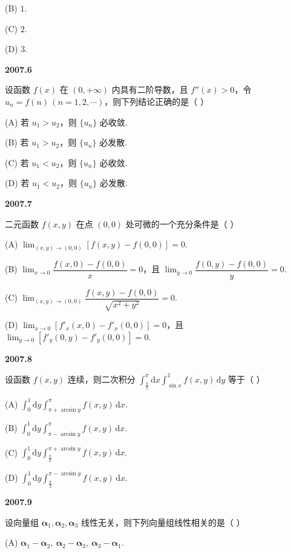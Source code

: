 \documentclass[UTF8,12pt,fontset=windows]{ctexart}
\begin{document}
(B) $1$.

(C) $2$.

(D) $3$.

\vfill
\newpage
{\large\bfseries 2007.6}

设函数 $f(x)$ 在 $(0,+\infty)$ 内具有二阶导数，且 $f''(x) > 0$，令 $u_n = f(n)\,(n = 1,2,\cdots)$，则下列结论正确的是（ ）

(A) 若 $u_1 > u_2$，则 $\{u_n\}$ 必收敛.

(B) 若 $u_1 > u_2$，则 $\{u_n\}$ 必发散.

(C) 若 $u_1 < u_2$，则 $\{u_n\}$ 必收敛.

(D) 若 $u_1 < u_2$，则 $\{u_n\}$ 必发散.

\vfill
\newpage
{\large\bfseries 2007.7}

二元函数 $f(x,y)$ 在点 $(0,0)$ 处可微的一个充分条件是（ ）

(A) $\lim_{(x,y) \to (0,0)}\left[f(x,y)-f(0,0)\right] = 0$.

(B) $\lim_{x \to 0}\dfrac{f(x,0)-f(0,0)}{x} = 0$，且 $\lim_{y \to 0}\dfrac{f(0,y)-f(0,0)}{y} = 0$.

(C) $\lim_{(x,y) \to (0,0)}\dfrac{f(x,y)-f(0,0)}{\sqrt{x^2+y^2}} = 0$.

(D) $\lim_{x \to 0}\left[f'_x(x,0)-f'_x(0,0)\right] = 0$，且 $\lim_{y \to 0}\left[f'_y(0,y)-f'_y(0,0)\right] = 0$.

\vfill
\newpage
{\large\bfseries 2007.8}

设函数 $f(x,y)$ 连续，则二次积分 $\displaystyle\int_{\frac{\pi}{2}}^{\pi}\mathrm{d}x\int_{\sin x}^{1} f(x,y)\,\mathrm{d}y$ 等于（ ）

(A) $\displaystyle\int_0^1 \mathrm{d}y\int_{\pi+\arcsin y}^{\pi} f(x,y)\,\mathrm{d}x$.

(B) $\displaystyle\int_0^1 \mathrm{d}y\int_{\pi-\arcsin y}^{\pi} f(x,y)\,\mathrm{d}x$.

(C) $\displaystyle\int_0^1 \mathrm{d}y\int_{\frac{\pi}{2}}^{\pi+\arcsin y} f(x,y)\,\mathrm{d}x$.

(D) $\displaystyle\int_0^1 \mathrm{d}y\int_{\frac{\pi}{2}}^{\pi-\arcsin y} f(x,y)\,\mathrm{d}x$.

\vfill
\newpage
{\large\bfseries 2007.9}

设向量组 $\boldsymbol{\alpha}_1,\boldsymbol{\alpha}_2,\boldsymbol{\alpha}_3$ 线性无关，则下列向量组线性相关的是（ ）

(A) $\boldsymbol{\alpha}_1-\boldsymbol{\alpha}_2,\ \boldsymbol{\alpha}_2-\boldsymbol{\alpha}_3,\ \boldsymbol{\alpha}_3-\boldsymbol{\alpha}_1$.
\end{document}
